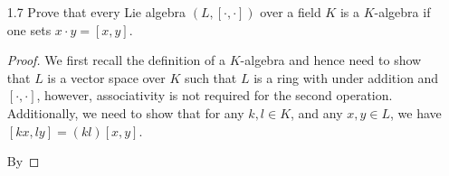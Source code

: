 \documentclass[12pt]{article}
\theoremstyle{definition}
\newenvironment{solution}
{\renewcommand\qedsymbol{$\blacksquare$}\begin{proof}[Solution]}
{\end{proof}}
\begin{document}
\begin{enumerate}
\begin{enumerate}[label=(\alph*)]
\begin{solution}
                        Considering that the definition of this set requires
                        that the entries be elements of $\mathbb{R}$ and that
                        the trace must be zero, then we find that we have two
                        ``free" entries in the upper right and lower left, and
                        that we have only one free entry along the diagonal
                        since the other must be its additive inverse. Hence,
                        a basis for this Lie algebra is 
                        \begin{align*}
                            \begin{pmatrix}0&1\\0&0 \end{pmatrix},&
                            &\begin{pmatrix}0&0\\1&0\end{pmatrix},
                            & &\begin{pmatrix}1&0\\0&-1\end{pmatrix}.
                        \end{align*}
                    \end{solution}
                \item Find
                    $\text{dim}_{\mathbb{R}}(\mathfrak{sl}_{2}(\mathbb{R}))$.
                    \begin{solution}
                        Considering the basis provided in part (b), we can
                        conclude that this Lie algebra has dimension 3.
                    \end{solution}
            \end{enumerate}
        \item[1.7] Prove that every Lie algebra $(L,[\cdot, \cdot])$ over
            a field $K$ is a $K$-algebra if one sets $x\cdot y=[x, y]$.
            \begin{proof}
                We first recall the definition of a $K$-algebra and hence need
                to show that $L$ is a vector space over $K$ such that $L$ is
                a ring with under addition and $[\cdot, \cdot]$, however,
                associativity is not required for the second operation.
                Additionally, we need to show that for any $k, l\in K$, and any
                $x, y\in L$, we have $[kx, ly]=(kl)[x, y]$.\par\hspace{4mm} By

\end{proof}
\end{enumerate}
\end{document}
